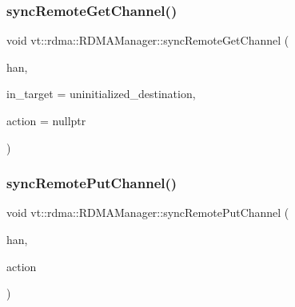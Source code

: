 \mbox{\label{structvt_1_1rdma_1_1_r_d_m_a_manager_afaa2ab82b754c4a231c3d728fe0a9e88}} 
\subsubsection{\texorpdfstring{sync\+Remote\+Get\+Channel()}{syncRemoteGetChannel()}}
{\footnotesize\ttfamily void vt\+::rdma\+::\+R\+D\+M\+A\+Manager\+::sync\+Remote\+Get\+Channel (\begin{DoxyParamCaption}\item[{\hyperlink{namespacevt_a10442579ec4e7ebef223818e64bcf908}{R\+D\+M\+A\+\_\+\+Handle\+Type} const \&}]{han,  }\item[{\hyperlink{namespacevt_a866da9d0efc19c0a1ce79e9e492f47e2}{Node\+Type} const \&}]{in\+\_\+target = {\ttfamily uninitialized\+\_\+destination},  }\item[{\hyperlink{namespacevt_ae0a5a7b18cc99d7b732cb4d44f46b0f3}{Action\+Type} const \&}]{action = {\ttfamily nullptr} }\end{DoxyParamCaption})\hspace{0.3cm}{\ttfamily [inline]}}

\mbox{\label{structvt_1_1rdma_1_1_r_d_m_a_manager_a9b6fb7fac7c6b534659705cf4ad20658}} 
\subsubsection{\texorpdfstring{sync\+Remote\+Put\+Channel()}{syncRemotePutChannel()}\hspace{0.1cm}{\footnotesize\ttfamily [1/2]}}
{\footnotesize\ttfamily void vt\+::rdma\+::\+R\+D\+M\+A\+Manager\+::sync\+Remote\+Put\+Channel (\begin{DoxyParamCaption}\item[{\hyperlink{namespacevt_a10442579ec4e7ebef223818e64bcf908}{R\+D\+M\+A\+\_\+\+Handle\+Type} const \&}]{han,  }\item[{\hyperlink{namespacevt_ae0a5a7b18cc99d7b732cb4d44f46b0f3}{Action\+Type} const \&}]{action }\end{DoxyParamCaption})\hspace{0.3cm}{\ttfamily [inline]}}

